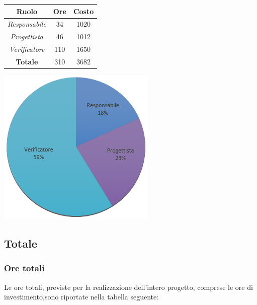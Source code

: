 \begin{center}
  \centering
  \begin{tabular}{|c|c|c|}
    \hline
    \textbf{Ruolo} & \textbf{Ore} & \textbf{Costo} \\
    \hline
     \emph{Responsabile}  & 34 & 1020 \\
    \hline  \emph{Progettista}  & 46 & 1012 \\
    \hline  \emph{Verificatore}  & 110 & 1650 \\
    \hline
    \textbf{Totale} & 310 & 3682 \\
    \hline
  \end{tabular}
  \includegraphics[scale=0.7]{img/6-Validazione.png}
\end{center}

\subsection{Totale}
\subsubsection{Ore totali}
Le ore totali, previste per la realizzazione dell’intero progetto, comprese le ore di investimento,sono riportate nella tabella seguente: \\ \\

